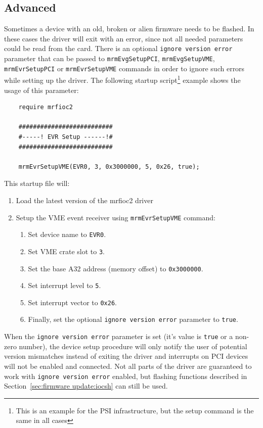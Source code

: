 \documentclass[12pt,a4paper]{article}
\begin{document}
\subsection{Advanced} \label{sec:firmware update:advanced}
Sometimes a device with an old, broken or alien firmware needs to be flashed. In these cases the driver will exit with an error, since not all needed parameters could be read from the card. There is an optional \texttt{ignore version error} parameter that can be passed to \texttt{mrmEvgSetupPCI}, \texttt{mrmEvgSetupVME}, \texttt{mrmEvrSetupPCI} or \texttt{mrmEvrSetupVME} commands in order to ignore such errors while setting up the driver. The following startup script\footnote{This is an example for the PSI infrastructure, but the setup command is the same in all cases} example shows the usage of this parameter:
\begin{verbatim}
	require mrfioc2
	
	##########################
	#-----! EVR Setup ------!#
	##########################
	
	mrmEvrSetupVME(EVR0, 3, 0x3000000, 5, 0x26, true);
\end{verbatim}
This startup file will:
\begin{enumerate}
\item Load the latest version of the mrfioc2 driver
\item Setup the VME event receiver using \texttt{mrmEvrSetupVME} command:
	\begin{enumerate}
	\item Set device name to \texttt{EVR0}.
	\item Set VME crate slot to \texttt{3}.
	\item Set the base A32 address (memory offset) to \texttt{0x3000000}.
	\item Set interrupt level to \texttt{5}.
	\item Set interrupt vector to \texttt{0x26}.
	\item Finally, set the optional \texttt{ignore version error} parameter to \texttt{true}.
	\end{enumerate}
\end{enumerate}
When the \texttt{ignore version error} parameter is set (it's value is \texttt{true} or a non-zero number), the device setup procedure will only notify the user of potential version mismatches instead of exiting the driver and interrupts on PCI devices will not be enabled and connected. Not all parts of the driver are guaranteed to work with \texttt{ignore version error} enabled, but flashing functions described in Section~\ref{sec:firmware update:iocsh} can still be used.
\end{document}
